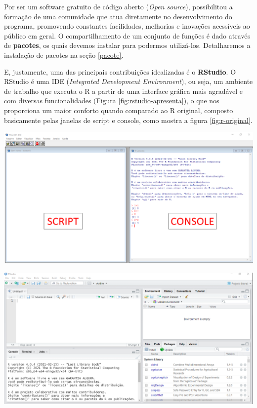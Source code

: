 \documentclass[
  brazilian,
]{book}
\let\origfigure\figure
\let\endorigfigure\endfigure
\renewenvironment{figure}[1][2] {
    \expandafter\origfigure\expandafter[H]
} {
    \endorigfigure
}
\begin{document}
Por ser um software gratuito de código aberto (\emph{Open source}), possibilitou a formação de uma comunidade que atua diretamente no desenvolvimento do programa, promovendo constantes facilidades, melhorias e inovações acessíveis ao público em geral. O compartilhamento de um conjunto de funções é dado através de \textbf{pacotes}, os quais devemos instalar para podermos utilizá-los. Detalharemos a instalação de pacotes na seção \ref{pacote}.

E, justamente, uma das principais contribuições idealizadas é o \textbf{RStudio}. O RStudio é uma IDE (\emph{Integrated Development Environment}), ou seja, um ambiente de trabalho que executa o R a partir de uma interface gráfica mais agradável e com diversas funcionalidades (Figura \ref{fig:rstudio-apresenta}), o que nos proporciona um maior conforto quando comparado ao R original, composto basicamente pelas janelas de script e console, como mostra a figura \ref{fig:r-original}.

\begin{figure}

{\centering \includegraphics[width=0.7\linewidth]{imagens/r_tela_basico} 

}

\caption{Tela do R original. Composto apenas pelo script e console.}\label{fig:r-original}
\end{figure}

\begin{figure}

{\centering \includegraphics[width=0.7\linewidth]{imagens/rstudio_tela} 

}

\caption{Tela do RStudio. Como podemos perceber, bem diferente do R original.}\label{fig:rstudio-apresenta}
\end{figure}
\end{document}
